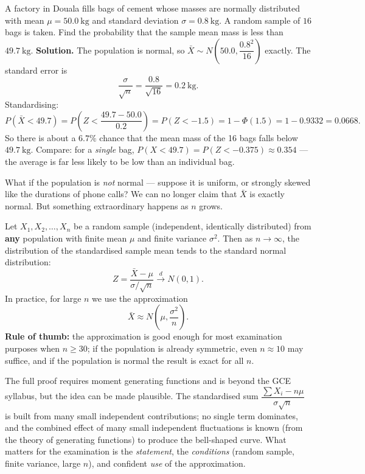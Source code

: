 \documentclass[11pt]{article}
\newcounter{popsec}
\newcounter{popsub}
\newcommand{\courssub}[1]{%
  \stepcounter{popsub}%
  \par\vspace{9pt}\noindent{\popxbold\fontsize{11.5}{13}\selectfont\color{popink}{\color{poporange}\thepopsec.\thepopsub}\hspace{6pt}#1}\par\nopagebreak\vspace{4pt}
}
\begin{document}
\begin{exoresolu}
A factory in Douala fills bags of cement whose masses are normally distributed with mean $\mu = 50.0\ \mathrm{kg}$ and standard deviation $\sigma = 0.8\ \mathrm{kg}$. A random sample of $16$ bags is taken. Find the probability that the sample mean mass is less than $49.7\ \mathrm{kg}$.
\tcblower
\textbf{Solution.} The population is normal, so $\bar{X} \sim N\!\left(50.0, \dfrac{0.8^{2}}{16}\right)$ exactly. The standard error is
\[ \frac{\sigma}{\sqrt{n}} = \frac{0.8}{\sqrt{16}} = 0.2\ \mathrm{kg}. \]
Standardising:
\[ P(\bar{X} < 49.7) = P\!\left(Z < \frac{49.7 - 50.0}{0.2}\right) = P(Z < -1.5) = 1 - \Phi(1.5) = 1 - 0.9332 = 0.0668. \]
So there is about a $6.7\%$ chance that the mean mass of the 16 bags falls below $49.7\ \mathrm{kg}$. Compare: for a \emph{single} bag, $P(X < 49.7) = P(Z < -0.375) \approx 0.354$ --- the average is far less likely to be low than an individual bag.
\end{exoresolu}

\courssub{The Central Limit Theorem}

What if the population is \emph{not} normal --- suppose it is uniform, or strongly skewed like the durations of phone calls? We can no longer claim that $\bar{X}$ is exactly normal. But something extraordinary happens as $n$ grows.

\begin{propriete}
Let $X_{1}, X_{2}, \dots, X_{n}$ be a random sample (independent, identically distributed) from \textbf{any} population with finite mean $\mu$ and finite variance $\sigma^{2}$. Then as $n \to \infty$, the distribution of the standardised sample mean tends to the standard normal distribution:
\[ Z = \frac{\bar{X} - \mu}{\sigma/\sqrt{n}} \xrightarrow{\;d\;} N(0,1). \]
In practice, for large $n$ we use the approximation
\[ \bar{X} \approx N\!\left(\mu, \frac{\sigma^{2}}{n}\right). \]
\textbf{Rule of thumb:} the approximation is good enough for most examination purposes when $n \geq 30$; if the population is already symmetric, even $n \approx 10$ may suffice, and if the population is normal the result is exact for all $n$.
\end{propriete}

The full proof requires moment generating functions and is beyond the GCE syllabus, but the idea can be made plausible. The standardised sum $\dfrac{\sum X_{i} - n\mu}{\sigma\sqrt{n}}$ is built from many small independent contributions; no single term dominates, and the combined effect of many small independent fluctuations is known (from the theory of generating functions) to produce the bell-shaped curve. What matters for the examination is the \emph{statement}, the \emph{conditions} (random sample, finite variance, large $n$), and confident \emph{use} of the approximation.
\end{document}
